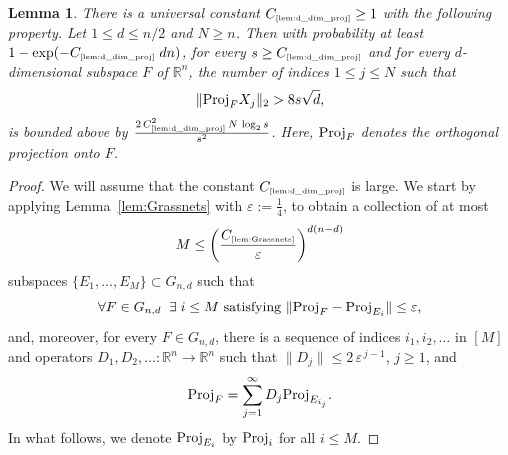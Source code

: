 \documentclass[11pt]{amsart}
\newtheorem{lemma}[theorem]{Lemma}
\theoremstyle{definition}
\theoremstyle{plain}
\newcommand{\R}{\mathbb{R}}
\def\R{{\mathbb R}}
\def\Proj{{\rm Proj}}
\newcommand{\tref}[1]{\text{\tiny{\ref{#1}}}}
\begin{document}
\begin{lemma}
\label{lem:d_dim_proj}
There is a universal constant $C_{\tref{lem:d_dim_proj}}\ge 1$
with the following property.
Let $1\leq d\leq n/2$ and $N\geq n$.
Then with probability at least
$1 - \exp(- C_{\tref{lem:d_dim_proj}}\; dn)$,  
for every $s \ge C_{\tref{lem:d_dim_proj}}$ and
for every $d$-dimensional subspace $F$ of $\R^n$, the number of indices $1 \le j \le N$ such that
\[
\|\Proj_F X_j\|_2 > 8s \sqrt{d},
\]
is bounded above by
$\frac{2\,C_{\tref{lem:d_dim_proj}}^2\,N\, \log_2 s}{s^2}$.
Here, $\Proj_F$ denotes the orthogonal projection onto $F$.
\end{lemma}
\begin{proof}
We will assume that the constant
$C_{\tref{lem:d_dim_proj}}$ is large.
We start by applying Lemma~\ref{lem:Grassnets}
with $\varepsilon:=\frac{1}{4}$,
to obtain a collection of at most 
\begin{equation}\label{eq:ljhbafjhbfkjahsbfkjhfb}
M\leq \left( \frac{C_{\text{\tiny\ref{lem:Grassnets}}}}{\varepsilon} \right)^{d(n - d)}    
\end{equation}
subspaces $\{E_1, \dots, E_M\}\subset G_{n,d}$
such that
\[
\forall F \in G_{n,d} \;\; \exists\; i \le M \text{ satisfying } \|\Proj_F - \Proj_{E_i}\| \le \varepsilon,
\]
and, moreover,
for every $F \in G_{n,d}$, there is a sequence of indices
$i_1,i_2,\dots$ in $[M]$ and operators $D_1,D_2,\dots:\R^n\to\R^n$
such that $\|D_j\| \le 2\, \varepsilon^{\,j-1}$, $j\geq 1$, and
\[
\Proj_{F}= \sum_{j=1}^\infty D_j \Proj_{E_{i_j}}.
\]
In what follows, we denote $\Proj_{E_{i}}$ by $\Proj_{i}$
for all $i\leq M$.


\end{proof}
\end{document}
